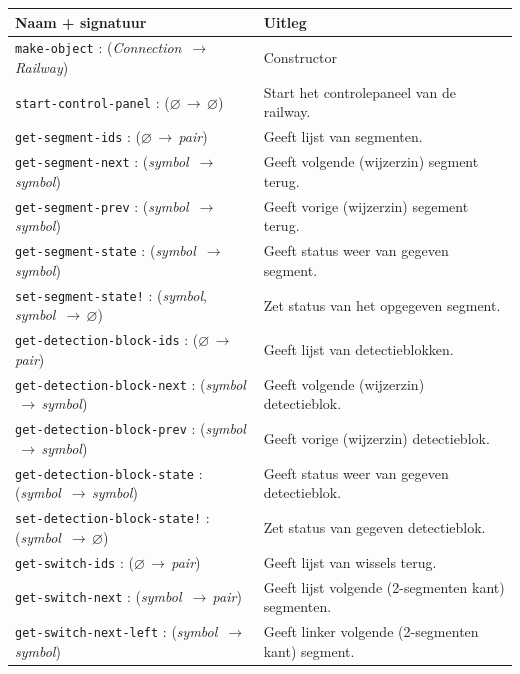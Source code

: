 \documentclass[a4paper, 11pt]{article}
\newcommand{\naar}{\,$\rightarrow$\,}
\renewcommand{\empty}{$\varnothing$}
\newcommand{\<}{\scriptsize\textless\normalsize}
\renewcommand{\>}{\scriptsize\textgreater\normalsize}
\begin{document}
\begin{table}[H]
	\begin{center}
		{
		\begin{tabular}{|l l|}
			\hline
			\textbf{Naam + signatuur} & \textbf{Uitleg}\\
			\hline
			\texttt{make-object} : (\textit{Connection} \naar \textit{Railway}) & Constructor\\
			\hline
			\texttt{start-control-panel} : (\empty \naar \empty) & Start het controlepaneel van de railway.\\
			\texttt{get-segment-ids} : (\empty \naar \textit{pair}) & Geeft lijst van segmenten.\\
			\texttt{get-segment-next} : (\textit{symbol} \naar \textit{symbol}) & Geeft volgende (wijzerzin) segment terug.\\
			\texttt{get-segment-prev} : (\textit{symbol} \naar \textit{symbol}) & Geeft vorige (wijzerzin) segement terug. \\
			\texttt{get-segment-state} : (\textit{symbol} \naar \textit{symbol}) & Geeft status weer van gegeven segment.\\
			\texttt{set-segment-state!} : (\textit{symbol}, \textit{symbol} \naar \empty) & Zet status van het opgegeven segment.\\
			\texttt{get-detection-block-ids} : (\empty \naar \textit{pair}) & Geeft lijst van detectieblokken.\\
			\texttt{get-detection-block-next} : (\textit{symbol} \naar \textit{symbol}) & Geeft volgende (wijzerzin) detectieblok.\\
			\texttt{get-detection-block-prev} : (\textit{symbol} \naar \textit{symbol}) & Geeft vorige (wijzerzin) detectieblok.\\
			\texttt{get-detection-block-state} : (\textit{symbol} \naar \textit{symbol}) & Geeft status weer van gegeven detectieblok.\\
			\texttt{set-detection-block-state!} : (\textit{symbol} \naar \empty) & Zet status van gegeven detectieblok.\\
			\texttt{get-switch-ids} : (\empty \naar \textit{pair}) & Geeft lijst van wissels terug.\\
			\texttt{get-switch-next} : (\textit{symbol} \naar \textit{pair}) & Geeft lijst volgende (2-segmenten kant) segmenten.\\
			\texttt{get-switch-next-left} : (\textit{symbol} \naar \textit{symbol}) & Geeft linker volgende (2-segmenten kant) segment.\\

\end{tabular}}
\end{center}
\end{table}
\end{document}
